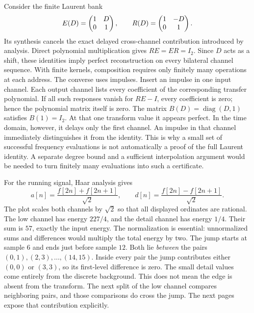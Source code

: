 Consider the finite Laurent bank
\[
E(D)=\begin{pmatrix}1&D\\0&1\end{pmatrix},\qquad
R(D)=\begin{pmatrix}1&-D\\0&1\end{pmatrix}.
\]
Its synthesis cancels the exact delayed cross-channel contribution introduced by analysis.
Direct polynomial multiplication gives $RE=ER=I_2$. Since $D$ acts as a shift, these identities imply perfect reconstruction on every bilateral channel sequence. With finite kernels, composition requires only finitely many operations at each address.
The converse uses impulses. Insert an impulse in one input channel. Each output channel lists every coefficient of the corresponding transfer polynomial. If all such responses vanish for $RE-I$, every coefficient is zero; hence the polynomial matrix itself is zero.
The matrix $B(D)=\operatorname{diag}(D,1)$ satisfies $B(1)=I_2$. At that one transform value it appears perfect. In the time domain, however, it delays only the first channel. An impulse in that channel immediately distinguishes it from the identity.
This is why a small set of successful frequency evaluations is not automatically a proof of the full Laurent identity. A separate degree bound and a sufficient interpolation argument would be needed to turn finitely many evaluations into such a certificate.

For the running signal, Haar analysis gives
\[
a[n]=\frac{f[2n]+f[2n+1]}{\sqrt2},\qquad
d[n]=\frac{f[2n]-f[2n+1]}{\sqrt2}.
\]
The plot scales both channels by $\sqrt2$ so that all displayed ordinates are rational.
The low channel has energy $227/4$, and the detail channel has energy $1/4$. Their sum is $57$, exactly the input energy. The normalization is essential: unnormalized sums and differences would multiply the total energy by two.
The jump starts at sample $6$ and ends just before sample $12$. Both lie \emph{between} the pairs $(0,1),(2,3),\ldots,(14,15)$. Inside every pair the jump contributes either $(0,0)$ or $(3,3)$, so its first-level difference is zero. The small detail values come entirely from the discrete background.
This does not mean the edge is absent from the transform. The next split of the low channel compares neighboring pairs, and those comparisons do cross the jump. The next pages expose that contribution explicitly.

